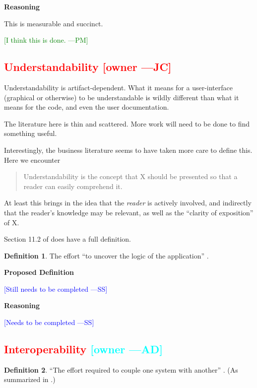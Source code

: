 \documentclass[letterpaper,cleveref]{lipics-v2019}
\newcommand{\authornote}[3]{\textcolor{#1}{[#3 ---#2]}}
\newcommand{\authornote}[3]{}
\newcommand{\wss}[1]{\authornote{blue}{SS}{#1}} %
\newcommand{\jc}[1]{\authornote{red}{JC}{#1}} %
\newcommand{\pmi}[1]{\authornote{green}{PM}{#1}} %
\newcommand{\ad}[1]{\authornote{cyan}{AD}{#1}} %
\newcommand{\notdone}[1]{\textcolor{red}{#1}}
\theoremstyle{definition}
\newtheorem{defn}{Definition}
\begin{document}
\noindent \textbf{Reasoning}

This is measurable and succinct. 

\pmi{I think this is done.}

\subsection{\notdone{Understandability} \jc{owner}}

Understandability is artifact-dependent. What it means for a user-interface (graphical
or otherwise) to be understandable is wildly different than what it means for the code,
and even the user documentation.

The literature here is thin and scattered.  More work will need to be done to find
something useful.

Interestingly, the business literature seems to have taken more care to define this.
Here we encounter
\begin{quote}
Understandability is the concept that X should be presented
so that a reader can easily comprehend it.
\end{quote}
At least this brings in the idea that the \emph{reader} is actively involved, and
indirectly that the reader's knowledge may be relevant, as well as the
``clarity of exposition'' of X.

Section 11.2 of \citet{adams2015nonfunctional} does have a full definition.

\begin{defn}
The effort ``to uncover the logic of the application''
\citep{ghezzi1991fundamentals}.
\end{defn}

\noindent \textbf{Proposed Definition}

\wss{Still needs to be completed}

\noindent \textbf{Reasoning}

\wss{Needs to be completed}

\subsection{\notdone{Interoperability} \ad{owner}}

\begin{defn}
  ``The effort required to couple one system with another''
  \citep{McCallEtAl1977}. (As summarized in \citet{VanVliet2000}.)
\end{defn}
\end{document}
